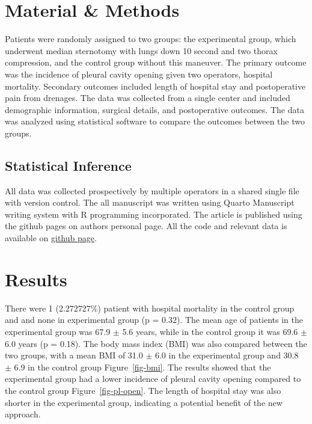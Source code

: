 \documentclass[
  letterpaper,
  DIV=11,
  numbers=noendperiod]{scrartcl}
\begin{document}
\section{Material \& Methods}\label{sec-data-methods}

Patients were randomly assigned to two groups: the experimental group,
which underwent median sternotomy with lungs down 10 second and two
thorax compression, and the control group without this maneuver. The
primary outcome was the incidence of pleural cavity opening given two
operators, hospital mortality. Secondary outcomes included length of
hospital stay and postoperative pain from drenages. The data was
collected from a single center and included demographic information,
surgical details, and postoperative outcomes. The data was analyzed
using statistical software to compare the outcomes between the two
groups.

\subsection{Statistical Inference}\label{statistical-inference}

All data was collected prospectively by multiple operators in a shared
single file with version control. The all manuscript was written using
Quarto Manuscript writing system with R programming incorporated. The
article is published using the github pages on authors personal page.
All the code and relevant data is available on
\href{https://github.com/raffdoc/manuscript-template}{github page}.

\section{Results}\label{results}

There were 1 (2.272727\%) patient with hospital mortality in the control
group and and none in experimental group (p = 0.32). The mean age of
patients in the experimental group was 67.9 \(\pm\) 5.6 years, while in
the control group it was 69.6 \(\pm\) 6.0 years (p = 0.18). The body
mass index (BMI) was also compared between the two groups, with a mean
BMI of 31.0 \(\pm\) 6.0 in the experimental group and 30.8 \(\pm\) 6.9
in the control group Figure~\ref{fig-bmi}. The results showed that the
experimental group had a lower incidence of pleural cavity opening
compared to the control group Figure~\ref{fig-pl-open}. The length of
hospital stay was also shorter in the experimental group, indicating a
potential benefit of the new approach.
\end{document}
